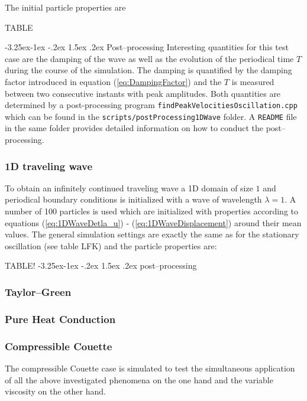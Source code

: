 \documentclass{report}
\makeatletter
\renewcommand\paragraph{\@startsection{paragraph}{4}{\z@}%
  {-3.25ex\@plus -1ex \@minus -.2ex}%
  {1.5ex \@plus .2ex}%
  {\normalfont\normalsize\bfseries}}
\makeatother
\begin{document}
The initial particle properties are


TABLE

\paragraph{Post--processing}
Interesting quantities for this test case are the damping of the wave as well as the evolution of the periodical time $T$ during the course of the simulation. The damping is quantified by the damping factor introduced in equation (\ref{eq:DampingFactor}) and the $T$ is measured between two consecutive instants with peak amplitudes. Both quantities are determined by a post-processing program {\tt findPeakVelocitiesOscillation.cpp} which can be found in the {\tt scripts/postProcessing1DWave} folder. A {\tt README} file in the same folder provides detailed information on how to conduct the post--processing.

\subsubsection{1D traveling wave}
To obtain an infinitely continued traveling wave a 1D domain of size $1$ and periodical boundary conditions is initialized with a wave of wavelength $\lambda=1$. A number of 100 particles is used which are initialized with properties according to equations (\ref{eq:1DWaveDetla_u}) - (\ref{eq:1DWaveDisplacement}) around their mean values.
The general simulation settings are exactly the same as for the stationary oscillation (see table LFK) and the particle properties are:

TABLE!
\paragraph{post--processing}


\subsubsection{Taylor--Green}
\subsubsection{Pure Heat Conduction}

\subsubsection{Compressible Couette}
\label{sec:SimuSetup_ComprCouette}
The compressible Couette case is simulated to test the simultaneous application of all the above investigated phenomena on the one hand and the variable viscosity on the other hand. 
\end{document}
